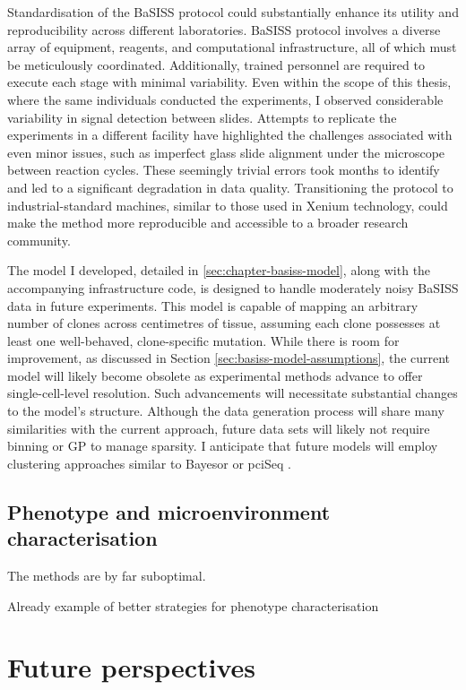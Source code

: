 Standardisation of the \ac{BaSISS} protocol could substantially enhance its utility and reproducibility across different laboratories. \ac{BaSISS} protocol involves a diverse array of equipment, reagents, and computational infrastructure, all of which must be meticulously coordinated. Additionally, trained personnel are required to execute each stage with minimal variability. Even within the scope of this thesis, where the same individuals conducted the experiments, I observed considerable variability in signal detection between slides. Attempts to replicate the experiments in a different facility have highlighted the challenges associated with even minor issues, such as imperfect glass slide alignment under the microscope between reaction cycles. These seemingly trivial errors took months to identify and led to a significant degradation in data quality. Transitioning the protocol to industrial-standard machines, similar to those used in Xenium technology, could make the method more reproducible and accessible to a broader research community.

The model I developed, detailed in \cref{sec:chapter-basiss-model}, along with the accompanying infrastructure code, is designed to handle moderately noisy \ac{BaSISS} data in future experiments. This model is capable of mapping an arbitrary number of clones across centimetres of tissue, assuming each clone possesses at least one well-behaved, clone-specific mutation. While there is room for improvement, as discussed in Section \cref{sec:basiss-model-assumptions}, the current model will likely become obsolete as experimental methods advance to offer single-cell-level resolution. Such advancements will necessitate substantial changes to the model's structure. Although the data generation process will share many similarities with the current approach, future data sets will likely not require binning or \ac{GP} to manage sparsity. I anticipate that future models will employ clustering approaches similar to Bayesor \parencite{Petukhov2022-pv} or pciSeq \parencite{Qian2020-mp}.

\subsection{Phenotype and microenvironment characterisation}

The methods are by far suboptimal.


Already example of better strategies for phenotype characterisation 


\section{Future perspectives}

